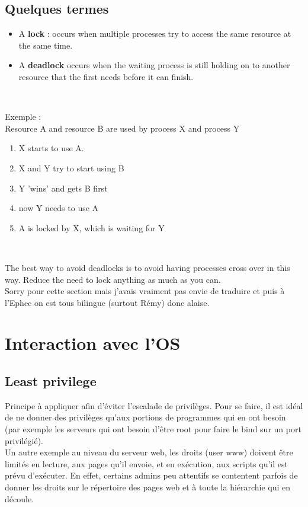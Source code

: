 \documentclass{report}
\begin{document}
\subsection{Quelques termes}

\begin{itemize}
    \item A \textbf{lock} : occurs when multiple processes try to access the same resource at the same time.
    \item A \textbf{deadlock} occurs when the waiting process is still holding on to another resource that the first needs before it can finish.
\end{itemize}~

Exemple :\\

Resource A and resource B are used by process X and process Y

\begin{enumerate}
    \item X starts to use A.
    \item X and Y try to start using B
    \item Y 'wins' and gets B first
    \item now Y needs to use A
    \item A is locked by X, which is waiting for Y
\end{enumerate}~

The best way to avoid deadlocks is to avoid having processes cross over in this way. Reduce the need to lock anything as much as you can.\\

Sorry pour cette section mais j'avais vraiment pas envie de traduire et puis à l'Ephec on est tous bilingue (surtout Rémy) donc alaise.

\section{Interaction avec l'OS}

\subsection{Least privilege}

Principe à appliquer afin d'éviter l'escalade de privilèges. Pour se faire, il est idéal de ne donner des privilèges qu'aux portions de programmes qui en ont besoin (par exemple les serveurs qui ont besoin d'être root pour faire le bind sur un port privilégié). \\Un autre exemple au niveau du serveur web, les droits (user www) doivent être limités en lecture, aux pages qu'il envoie, et en exécution, aux scripts qu'il est prévu d'exécuter. En effet, certains admins peu attentifs se contentent parfois de donner les droits sur le répertoire des pages web et à toute la hiérarchie qui en découle.
\end{document}

